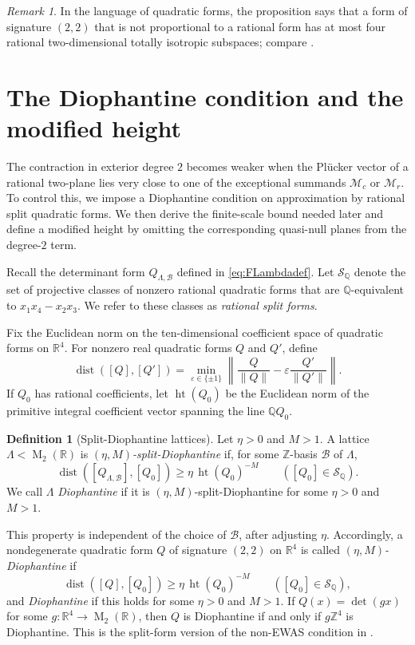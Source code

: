 \documentclass[reqno,11pt]{amsart}
\theoremstyle{definition}
\newtheorem{defn}[defn]{Definition}
\theoremstyle{remark}
\newtheorem{remark}[remark]{Remark}
\numberwithin{equation}{section}
\newcommand{\M}{\operatorname{M}}
\begin{document}
\begin{remark}
In the language of quadratic forms, the proposition says that a form of
signature $(2,2)$ that is not proportional to a rational form has at most
four rational two-dimensional totally isotropic subspaces; compare
\cite[Lemma~10.3]{eskin-margulis-mozes:2005}.
\end{remark}

\section{The Diophantine condition and the modified height}
\label{sec:diophantine-height}
The contraction in exterior degree $2$ becomes weaker when the
Pl\"ucker vector of a rational two-plane lies very close to one of the
exceptional summands $\mathcal M_c$ or $\mathcal M_r$. To control this, we
impose a Diophantine condition on approximation by rational split
quadratic forms. We then derive the finite-scale bound needed later and
define a modified height by omitting the corresponding quasi-null planes
from the degree-$2$ term.

Recall the determinant form $Q_{\Lambda,\mathcal B}$ defined in
\eqref{eq:FLambdadef}. Let $\mathscr S_{\mathbb Q}$ denote the set of
projective classes of nonzero rational quadratic forms that are
$\mathbb Q$-equivalent to $x_1x_4-x_2x_3$. We refer to these classes as
\emph{rational split forms}.

Fix the Euclidean norm on the ten-dimensional coefficient space of
quadratic forms on $\mathbb R^4$. For nonzero real quadratic forms $Q$ and
$Q'$, define
$$
\operatorname{dist}([Q],[Q'])
=
\min_{\varepsilon\in\{\pm1\}}
\left\|
\frac{Q}{\|Q\|}
-
\varepsilon\frac{Q'}{\|Q'\|}
\right\|.
$$
If $Q_0$ has rational coefficients, let $\operatorname{ht}(Q_0)$ be the
Euclidean norm of the primitive integral coefficient vector spanning the
line $\mathbb Q Q_0$. 

\begin{defn}[Split-Diophantine lattices]\label{def:diophantine}
Let $\eta>0$ and $M>1$. A lattice $\Lambda<\M_2(\mathbb R)$ is
\emph{$(\eta,M)$-split-Diophantine} if, for some $\mathbb Z$-basis
$\mathcal B$ of $\Lambda$,
$$
\operatorname{dist}([Q_{\Lambda,\mathcal B}],[Q_0])
\ge
\eta\,\operatorname{ht}(Q_0)^{-M}
\qquad
([Q_0]\in\mathscr S_{\mathbb Q}).
$$
We call $\Lambda$ \emph{Diophantine} if it is
$(\eta,M)$-split-Diophantine for some $\eta>0$ and $M>1$.
\end{defn}
This property is independent of the choice of $\mathcal B$, after
adjusting $\eta$. Accordingly, a nondegenerate quadratic form $Q$ of
signature $(2,2)$ on $\mathbb R^4$ is called
\emph{$(\eta,M)$-Diophantine} if
\begin{equation}\label{dio}
\operatorname{dist}([Q],[Q_0])
\ge
\eta\,\operatorname{ht}(Q_0)^{-M}
\qquad
([Q_0]\in\mathscr S_{\mathbb Q}),
\end{equation}
and \emph{Diophantine} if this holds for some $\eta>0$ and $M>1$.
If $Q(x)=\det(gx)$ for some
$g:\mathbb R^4\to\M_2(\mathbb R)$, then $Q$ is
Diophantine if and only if $g\mathbb Z^4$ is Diophantine. This is
the split-form version of the non-EWAS condition in
\cite[Definition~1.2]{eskin-margulis-mozes:2005}. 
\end{document}
